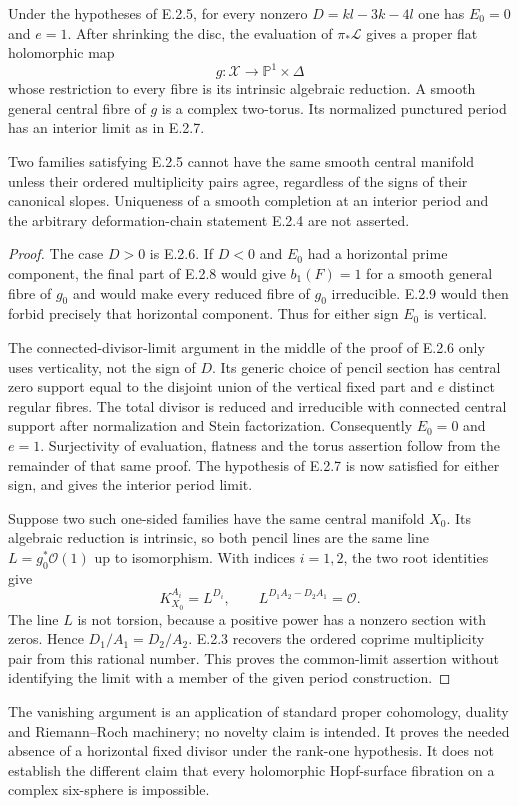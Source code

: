 \begin{proposition}
Under the hypotheses of E.2.5, for every nonzero
$D=kl-3k-4l$ one has $E_0=0$ and $e=1$.
After shrinking the disc, the evaluation of
$\pi_*\mathcal L$ gives a proper flat holomorphic map
\[
 g:\mathcal X\longrightarrow\mathbb P^1\times\Delta
\]
whose restriction to every fibre is its intrinsic algebraic
reduction.  A smooth general central fibre of $g$ is a
complex two-torus.  Its normalized punctured period has
an interior limit as in E.2.7.

Two families satisfying E.2.5 cannot have the same smooth
central manifold unless their ordered multiplicity pairs
agree, regardless of the signs of their canonical slopes.
Uniqueness of a smooth completion at an interior period and
the arbitrary deformation-chain statement E.2.4 are not
asserted.
\end{proposition}
\begin{proof}
The case $D>0$ is E.2.6.  If $D<0$ and $E_0$ had a
horizontal prime component, the final part of E.2.8 would
give $b_1(F)=1$ for a smooth general fibre of $g_0$ and
would make every reduced fibre of $g_0$ irreducible.
E.2.9 would then forbid precisely that horizontal component.
Thus for either sign $E_0$ is vertical.

The connected-divisor-limit argument in the middle of the
proof of E.2.6 only uses verticality, not the sign of $D$.
Its generic choice of pencil section has central zero
support equal to the disjoint union of the vertical fixed
part and $e$ distinct regular fibres.  The total divisor
is reduced and irreducible with connected central support
after normalization and Stein factorization.  Consequently
$E_0=0$ and $e=1$.  Surjectivity of evaluation, flatness and
the torus assertion follow from the remainder of that same
proof.  The hypothesis of E.2.7 is now satisfied for either
sign, and gives the interior period limit.

Suppose two such one-sided families have the same central
manifold $X_0$.  Its algebraic reduction is intrinsic, so
both pencil lines are the same line
$L=g_0^*\mathcal O(1)$ up to isomorphism.  With indices
$i=1,2$, the two root identities give
\[
 K_{X_0}^{A_i}=L^{D_i},\qquad
 L^{D_1A_2-D_2A_1}=\mathcal O.
\]
The line $L$ is not torsion, because a positive power has
a nonzero section with zeros.  Hence $D_1/A_1=D_2/A_2$.
E.2.3 recovers the ordered coprime multiplicity pair from
this rational number.  This proves the common-limit
assertion without identifying the limit with a member of
the given period construction.
\end{proof}

The vanishing argument is an application of standard proper
cohomology, duality and Riemann--Roch machinery; no novelty
claim is intended.  It proves the needed absence of a
horizontal fixed divisor under the rank-one hypothesis.
It does not establish the different claim that every
holomorphic Hopf-surface fibration on a complex six-sphere
is impossible.
